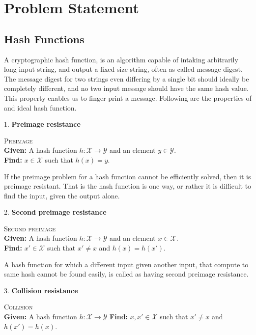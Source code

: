 \documentclass[12pt]{artikel3}                  %
\begin{document}
\section{Problem Statement}

\subsection{Hash Functions}
A cryptographic hash function, is an algorithm capable of intaking arbitrarily long input string, and
output a fixed size string, often as called message digest. The message digest for two strings
even differing by a single bit should ideally be completely different, and no two input message should
have the same hash value. This property enables us to finger print a message. Following are the properties
of and ideal hash function\cite{00005}.
  
1. {\bf Preimage resistance}
\begin{center}
  \framebox
  {
    \parbox{350pt}
    {
      \centering \textsc{Preimage} \\
      {\bf Given:} A hash function $h : \mathcal{X} \to \mathcal{Y}$ and an element $y \in \mathcal{Y}$. \\
      {\bf Find:} $x \in \mathcal{X}$ such that $h(x) = y$. 
    }
  }
\end{center}
\vspace{4mm}
If the preimage problem for a hash function cannot be efficiently solved, then it is preimage resistant.
That is the hash function is one way, or rather it is difficult to find the input, given the output alone.

2. {\bf Second preimage resistance}
\begin{center}
  \framebox
  {
    \parbox{350pt}
    {
      \centering \textsc{Second preimage} \\
      {\bf Given:} A hash function $h : \mathcal{X} \to \mathcal{Y}$ and an element $x \in \mathcal{X}$. \\
      {\bf Find:} $x' \in \mathcal{X}$ such that $x' \neq x$ and $h(x) = h(x')$. 
    }
  }
\end{center}
\vspace{4mm}

A hash function for which a different input given another input, that compute to same hash cannot be found 
easily, is called as having second preimage resistance.

3. {\bf Collision resistance}
\begin{center}
  \framebox
  {
    \parbox{350pt}
    {
      \centering \textsc{Collision} \\
      {\bf Given:} A hash function $h : \mathcal{X} \to \mathcal{Y}$ 
      {\bf Find:} $x, x' \in \mathcal{X}$ such that $x' \neq x$ and $h(x') = h(x)$. 
    }
  }
\end{center}
\vspace{4mm}
\end{document}

